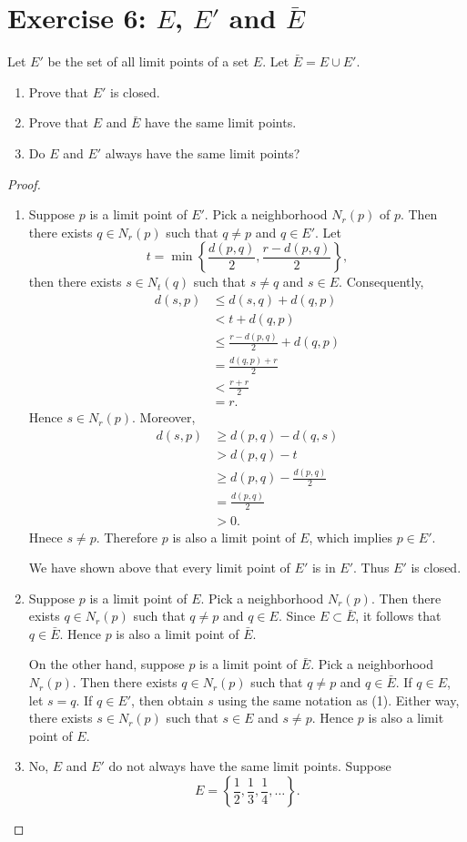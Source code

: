 \documentclass{amsbook}
\theoremstyle{definition}
\theoremstyle{remark}
\numberwithin{section}{chapter}
\numberwithin{equation}{chapter}
\begin{document}
\section{Exercise 6: $E$, $E'$ and $\bar E$}\label{Exercise 2.6}
Let $E'$ be the set of all limit points of a set $E$. Let $\bar E=E\cup E'$.
\begin{enumerate}
\item Prove that $E'$ is closed.
\item Prove that $E$ and $\bar E$ have the same limit points.
\item Do $E$ and $E'$ always have the same limit points?
\end{enumerate}
\begin{proof}
\begin{enumerate}
\item Suppose $p$ is a limit point of $E'$. Pick a neighborhood $N_r(p)$ of $p$. Then there exists $q\in N_r(p)$ such that $q\ne p$ and $q\in E'$. Let\[
t=\min\left\{\frac{d(p,q)}{2}, \frac{r-d(p,q)}{2}\right\},
\] then there exists $s\in N_t(q)$ such that $s\ne q$ and $s\in E$. Consequently,\[
\begin{split}
d(s,p)&\leqslant d(s,q)+d(q,p)\\
&<t+d(q,p)\\
&\leqslant\frac{r-d(p,q)}{2}+d(q,p)\\
&=\frac{d(q,p)+r}{2}\\
&<\frac{r+r}{2}\\
&=r.
\end{split}
\]
Hence $s\in N_r(p)$. Moreover,\[
\begin{split}
d(s,p)&\geqslant d(p,q)-d(q,s)\\
&>d(p,q)-t\\
&\geqslant d(p,q)-\frac{d(p,q)}{2}\\
&=\frac{d(p,q)}{2}\\
&>0.
\end{split}
\]
Hnece $s\ne p$. Therefore $p$ is also a limit point of $E$, which implies $p\in E'$.

We have shown above that every limit point of $E'$ is in $E'$. Thus $E'$ is closed.
\item Suppose $p$ is a limit point of $E$. Pick a neighborhood $N_r(p)$. Then there exists $q\in N_r(p)$ such that $q\ne p$ and $q\in E$. Since $E\subset\bar E$, it follows that $q\in \bar E$. Hence $p$ is also a limit point of $\bar E$.

On the other hand, suppose $p$ is a limit point of $\bar E$. Pick a neighborhood $N_r(p)$. Then there exists $q\in N_r(p)$ such that $q\ne p$ and $q\in\bar{E}$. If $q\in E$, let $s=q$. If $q\in E'$, then obtain $s$ using the same notation as (1). Either way, there exists $s\in N_r(p)$ such that $s\in E$ and $s\ne p$. Hence $p$ is also a limit point of $E$.
\item No, $E$ and $E'$ do not always have the same limit points. Suppose\[
E=\left\{\frac{1}{2},\frac{1}{3},\frac{1}{4},\dots\right\}.
\]


\end{enumerate}
\end{proof}
\end{document}
